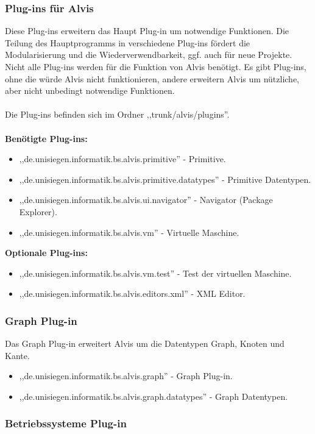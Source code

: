 \documentclass[10pt,a4paper]{article}
\begin{document}
\subsubsection{Plug-ins für Alvis}
Diese Plug-ins erweitern das Haupt Plug-in um notwendige Funktionen. Die Teilung des Hauptprogramms in verschiedene Plug-ins fördert die Modularisierung und die Wiederverwendbarkeit, ggf. auch für neue Projekte.
\\
Nicht alle Plug-ins werden für die Funktion von Alvis benötigt. Es gibt Plug-ins, ohne die würde Alvis nicht funktionieren, andere erweitern Alvis um nützliche, aber nicht unbedingt notwendige Funktionen.
\\ \\
Die Plug-ins befinden sich im Ordner ,,trunk/alvis/plugins''.
\\ \\
\textbf{Benötigte Plug-ins:}
\begin{itemize}
\item ,,de.unisiegen.informatik.bs.alvis.primitive'' - Primitive.
\item ,,de.unisiegen.informatik.bs.alvis.primitive.datatypes'' - Primitive Datentypen.
\item ,,de.unisiegen.informatik.bs.alvis.ui.navigator'' - Navigator (Package Explorer).
\item ,,de.unisiegen.informatik.bs.alvis.vm'' - Virtuelle Maschine.
\end{itemize}
\textbf{Optionale Plug-ins:}
\begin{itemize}
\item ,,de.unisiegen.informatik.bs.alvis.vm.test'' - Test der virtuellen Maschine.
\item ,,de.unisiegen.informatik.bs.alvis.editors.xml'' - XML Editor.
\end{itemize}
\subsubsection{Graph Plug-in}
Das Graph Plug-in erweitert Alvis um die Datentypen Graph, Knoten und Kante.
\begin{itemize}
\item ,,de.unisiegen.informatik.bs.alvis.graph'' - Graph Plug-in.
\item ,,de.unisiegen.informatik.bs.alvis.graph.datatypes'' - Graph Datentypen.
\end{itemize}
\subsubsection{Betriebssysteme Plug-in}
\end{document}
